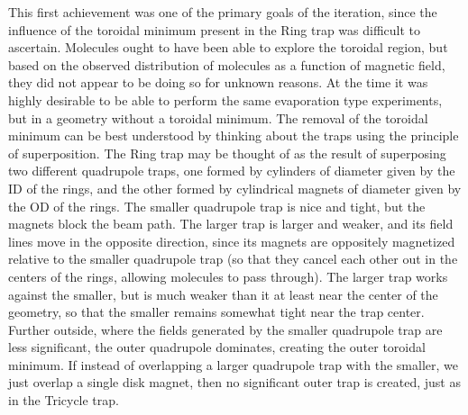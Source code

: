 This first achievement was one of the primary goals of the iteration, since the influence of the toroidal minimum present in the Ring trap was difficult to ascertain. 
Molecules ought to have been able to explore the toroidal region, but based on the observed distribution of molecules as a function of magnetic field, they did not appear to be doing so for unknown reasons.
At the time it was highly desirable to be able to perform the same evaporation type experiments, but in a geometry without a toroidal minimum.
The removal of the toroidal minimum can be best understood by thinking about the traps using the principle of superposition.
The Ring trap may be thought of as the result of superposing two different quadrupole traps, one formed by cylinders of diameter given by the ID of the rings, and the other formed by cylindrical magnets of diameter given by the OD of the rings.
The smaller quadrupole trap is nice and tight, but the magnets block the beam path.
The larger trap is larger and weaker, and its field lines move in the opposite direction, since its magnets are oppositely magnetized relative to the smaller quadrupole trap (so that they cancel each other out in the centers of the rings, allowing molecules to pass through).
The larger trap works against the smaller, but is much weaker than it at least near the center of the geometry, so that the smaller remains somewhat tight near the trap center.
Further outside, where the fields generated by the smaller quadrupole trap are less significant, the outer quadrupole dominates, creating the outer toroidal minimum.
If instead of overlapping a larger quadrupole trap with the smaller, we just overlap a single disk magnet, then no significant outer trap is created, just as in the Tricycle trap.

